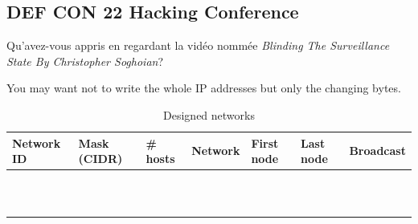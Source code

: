 \documentclass[11pt]{article}
\begin{document}
	\subsection{DEF CON 22 Hacking Conference}
		Qu'avez-vous appris en regardant la vidéo nommée \emph{Blinding The Surveillance State By Christopher Soghoian}?
\pagebreak

You may want not to write the whole IP addresses but only the changing bytes.
\renewcommand{\arraystretch}{1.5}
\setlength{\tabcolsep}{14pt}
	\begin{table}[h]
	  \centering
		  \begin{tabular}{|l|l|l|l|l|l|l|}
			  \hline
				Network ID	&	Mask (CIDR)	& \# hosts	& Network	&	First node	&	Last node	&	Broadcast	\\ \hline
				&&&&&&	\\ \hline
				&&&&&&	\\ \hline
				&&&&&&	\\ \hline
				&&&&&&	\\ \hline
				&&&&&&	\\ \hline
				&&&&&&	\\ \hline
				&&&&&&	\\ \hline
				&&&&&&	\\ \hline
				&&&&&&	\\ \hline
				&&&&&&	\\ \hline
				&&&&&&	\\ \hline
		  \end{tabular}
		  \caption{Designed networks}
	  \label{tab:design}
	\end{table}
\renewcommand{\arraystretch}{1.0}
\end{document}
